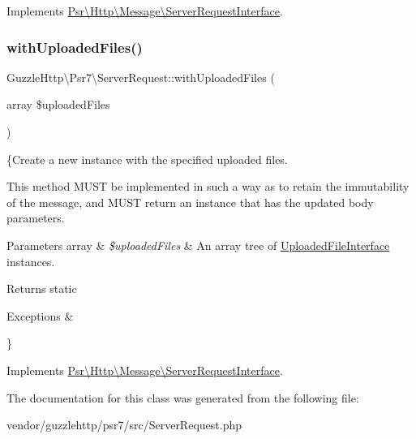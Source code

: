 Implements \hyperlink{interfacePsr_1_1Http_1_1Message_1_1ServerRequestInterface_aa291bcf612e3f975b929eeb6a23afbf6}{Psr\textbackslash{}\+Http\textbackslash{}\+Message\textbackslash{}\+Server\+Request\+Interface}.

\mbox{\label{classGuzzleHttp_1_1Psr7_1_1ServerRequest_ab2b182e14a422594ddc00c74c6de5f25}} 
\subsubsection{\texorpdfstring{with\+Uploaded\+Files()}{withUploadedFiles()}}
{\footnotesize\ttfamily Guzzle\+Http\textbackslash{}\+Psr7\textbackslash{}\+Server\+Request\+::with\+Uploaded\+Files (\begin{DoxyParamCaption}\item[{array}]{\$uploaded\+Files }\end{DoxyParamCaption})}

\{Create a new instance with the specified uploaded files.

This method M\+U\+ST be implemented in such a way as to retain the immutability of the message, and M\+U\+ST return an instance that has the updated body parameters.


\begin{DoxyParams}[1]{Parameters}
array & {\em \$uploaded\+Files} & An array tree of \hyperlink{interfacePsr_1_1Http_1_1Message_1_1UploadedFileInterface}{Uploaded\+File\+Interface} instances. \\
\hline
\end{DoxyParams}
\begin{DoxyReturn}{Returns}
static 
\end{DoxyReturn}

\begin{DoxyExceptions}{Exceptions}
{\em } & \\
\hline
\end{DoxyExceptions}
\} 

Implements \hyperlink{interfacePsr_1_1Http_1_1Message_1_1ServerRequestInterface_aeab9588f1afa2cdccd04671260ecaec8}{Psr\textbackslash{}\+Http\textbackslash{}\+Message\textbackslash{}\+Server\+Request\+Interface}.



The documentation for this class was generated from the following file\+:\begin{DoxyCompactItemize}
\item 
vendor/guzzlehttp/psr7/src/Server\+Request.\+php\end{DoxyCompactItemize}
